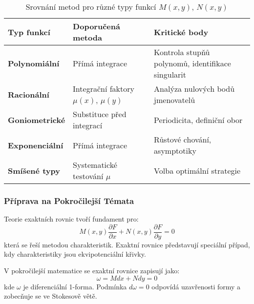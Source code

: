 \vspace{0.8\baselineskip}

\begin{table}[h]
\centering
\caption{Srovnání metod pro různé typy funkcí $M(x,y)$, $N(x,y)$}
\label{tab:srovnani-metod-exaktni}
\begin{tabular}{p{}p{}p{}}
\toprule
\textbf{Typ funkcí} & \textbf{Doporučená metoda} & \textbf{Kritické body} \\
\midrule
\textbf{Polynomiální} & Přímá integrace & Kontrola stupňů polynomů, identifikace singularit \\
\textbf{Racionální} & Integrační faktory $\mu(x)$, $\mu(y)$ & Analýza nulových bodů jmenovatelů \\
\textbf{Goniometrické} & Substituce před integrací & Periodicita, definiční obor \\
\textbf{Exponenciální} & Přímá integrace & Růstové chování, asymptotiky \\
\textbf{Smíšené typy} & Systematické testování $\mu$ & Volba optimální strategie \\
\bottomrule
\end{tabular}
\end{table}

\vspace{0.8\baselineskip}

\subsubsection{Příprava na Pokročilejší Témata}
\label{subsubsec:priprava-pokrocila-exaktni}

\begin{transition}
Teorie exaktních rovnic tvoří fundament pro:
\[
M(x,y) \frac{\partial F}{\partial x} + N(x,y) \frac{\partial F}{\partial y} = 0
\]
která se řeší metodou charakteristik. Exaktní rovnice představují speciální případ, kdy charakteristiky jsou ekvipotenciální křivky.
\end{transition}

\vspace{0.6\baselineskip}

\begin{transition}
V pokročilejší matematice se exaktní rovnice zapisují jako:
\[
\omega = M dx + N dy = 0
\]
kde $\omega$ je diferenciální 1-forma. Podmínka $d\omega = 0$ odpovídá uzavřenosti formy a zobecňuje se ve Stokesově větě.
\end{transition}

